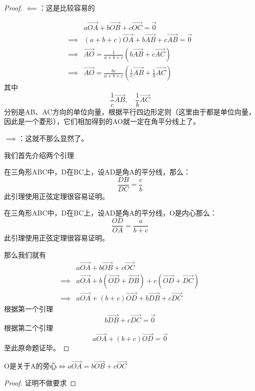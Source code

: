 \begin{proof}
    $\impliedby$：这是比较容易的

    $$
        \begin{aligned}
                     & a\Vec{OA} + b\Vec{OB} + c\Vec{OC} = \Vec{0}                          \\
            \implies & (a+b+c)\Vec{OA} +b\Vec{AB}+c\Vec{AB} = \Vec{0}                       \\
            \implies & \Vec{AO} = \frac{1}{a+b+c}(b\Vec{AB}+c\Vec{AC})                      \\
            \implies & \Vec{AO} = \frac{bc}{a+b+c}(\frac{1}{c}\Vec{AB}+\frac{1}{b}\Vec{AC})
        \end{aligned}
    $$
    其中
    $$
        \frac{1}{c}\Vec{AB}, \quad \frac{1}{b}\Vec{AC}
    $$
    分别是AB、AC方向的单位向量，根据平行四边形定则（这里由于都是单位向量，因此是一个菱形），它们相加得到的AO就一定在角平分线上了。

    $\implies$：这就不那么显然了。

    我们首先介绍两个引理
    \begin{lemma}[角平分线]
        在三角形ABC中，D在BC上，设AD是角A的平分线，那么：
        $$
            \frac{DB}{DC} = \frac{c}{b}
        $$
        此引理使用正弦定理很容易证明。
    \end{lemma}
    \begin{lemma}[内心]
        在三角形ABC中，D在BC上，设AD是角A的平分线，O是内心那么：
        $$
            \frac{OD}{OA} = \frac{a}{b+c}
        $$
        此引理使用正弦定理很容易证明。
    \end{lemma}
    那么我们就有
    $$
        \begin{aligned}
                     & a\Vec{OA} + b\Vec{OB} + c\Vec{OC}                    \\
            \implies & a\Vec{OA} +b(\Vec{OD}+\Vec{DB})+c(\Vec{OD}+\Vec{DC}) \\
            \implies & a\Vec{OA} + (b+c)\Vec{OD} + b\Vec{DB}+c\Vec{DC}
        \end{aligned}
    $$
    根据第一个引理
    $$
        b\Vec{DB}+c\Vec{DC} = \Vec{0}
    $$
    根据第二个引理
    $$
        a\Vec{OA} + (b+c)\Vec{OD} = \Vec{0}
    $$
    至此原命题证毕。
\end{proof}
\begin{theorem}
    O是关于A的旁心$\iff a\Vec{OA} = b\Vec{OB} + c\Vec{OC}$
\end{theorem}
\begin{proof}
    证明不做要求
\end{proof}